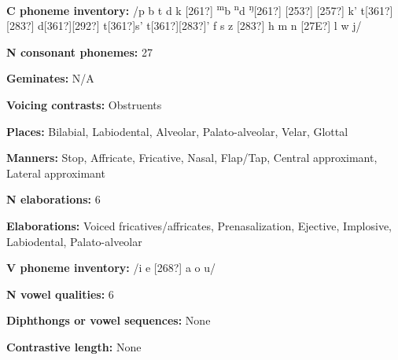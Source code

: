 \begin{styleBody}
\textbf{C phoneme inventory:} /p b t d k [261?] \textsuperscript{m}b \textsuperscript{n}d \textsuperscript{ŋ}[261?] [253?] [257?] k’ t[361?][283?] d[361?][292?] t[361?]s’ t[361?][283?]’ f s z [283?] h m n [27E?] l w j/
\end{styleBody}

\begin{styleBody}
\textbf{N consonant phonemes:} 27
\end{styleBody}

\begin{styleBody}
\textbf{Geminates:} N/A
\end{styleBody}

\begin{styleBody}
\textbf{Voicing contrasts:} Obstruents
\end{styleBody}

\begin{styleBody}
\textbf{Places:} Bilabial, Labiodental, Alveolar, Palato-alveolar, Velar, Glottal
\end{styleBody}

\begin{styleBody}
\textbf{Manners:} Stop, Affricate, Fricative, Nasal, Flap/Tap, Central approximant, Lateral approximant
\end{styleBody}

\begin{styleBody}
\textbf{N elaborations:} 6
\end{styleBody}

\begin{styleBody}
\textbf{Elaborations:} Voiced fricatives/affricates, Prenasalization, Ejective, Implosive, Labiodental, Palato-alveolar
\end{styleBody}

\begin{styleBody}
\textbf{V phoneme inventory:} /i e [268?] a o u/
\end{styleBody}

\begin{styleBody}
\textbf{N vowel qualities:} 6
\end{styleBody}

\begin{styleBody}
\textbf{Diphthongs or vowel sequences:} None
\end{styleBody}

\begin{styleBody}
\textbf{Contrastive length:} None
\end{styleBody}

